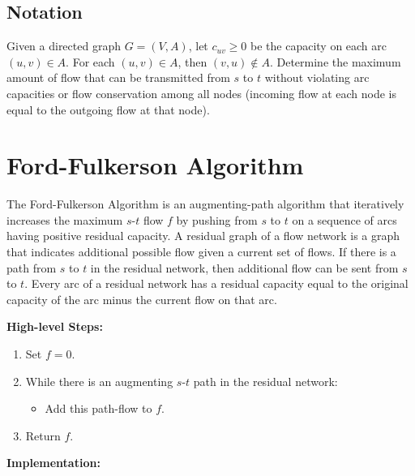 \documentclass[12pt]{article}
\theoremstyle{definition}
\begin{document}
\subsection{Notation}

Given a directed graph $G = (V, A)$, let $c_{uv} \ge 0$ be the capacity on each arc $(u,v) \in A$. For each $(u,v) \in A$, then $(v,u) \notin A$. Determine the maximum amount of flow that can be transmitted from $s$ to $t$ without violating arc capacities or flow conservation among all nodes (incoming flow at each node is equal to the outgoing flow at that node).


\section{Ford-Fulkerson Algorithm}

The Ford-Fulkerson Algorithm is an augmenting-path algorithm that iteratively increases the maximum $s$-$t$ flow $f$ by pushing from $s$ to $t$ on a sequence of arcs having positive residual capacity. A residual graph of a flow network is a graph that indicates additional possible flow given a current set of flows. If there is a path from $s$ to $t$ in the residual network, then additional flow can be sent from $s$ to $t$. Every arc of a residual network has a residual capacity equal to the original capacity of the arc minus the current flow on that arc. 

\textbf{High-level Steps:}


\begin{enumerate}
	\item Set $f = 0$. 
	\item While there is an augmenting $s$-$t$ path in the residual network:
	\begin{itemize}
		\item Add this path-flow to $f$.
	\end{itemize}
	\item Return $f$.

\end{enumerate}

\textbf{Implementation:}
\end{document}
